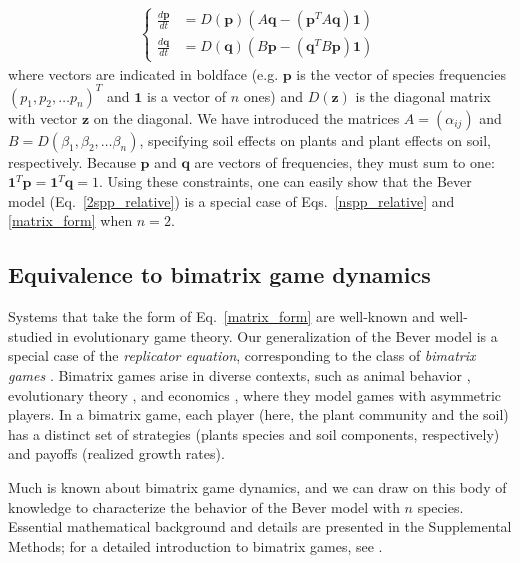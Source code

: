 \documentclass[11pt]{article}
\begin{document}
\begin{align} \label{matrix_form}
\begin{cases}
\frac{d\bm{p}}{dt} &= D(\bm{p}) \left(A \bm{q} - (\bm{p}^T A \bm{q}) \bm{1} \right) \\
\frac{d\bm{q}}{dt} &= D(\bm{q}) \left(B \bm{p} - (\bm{q}^T B \bm{p}) \bm{1}  \right) \,
\end{cases}
\end{align}
where vectors are indicated in boldface (e.g. $\bm{p}$ is the vector of species frequencies $(p_1, p_2, \dots p_n)^T$ and $\bm{1}$ is a vector of $n$ ones) and $D(\bm{z})$ is the diagonal matrix with vector $\bm{z}$ on the diagonal. We have introduced the matrices $A = (\alpha_{ij})$ and $B = D(\beta_1, \beta_2, \dots \beta_n)$, specifying soil effects on plants and plant effects on soil, respectively. Because $\bm{p}$ and $\bm{q}$ are vectors of frequencies, they must sum to one: $\bm{1}^T \bm{p} = \bm{1}^T \bm{q} = 1$. Using these constraints, one can easily show that the Bever model (Eq.~\ref{2spp_relative}) is a special case of Eqs.~\ref{nspp_relative} and \ref{matrix_form} when $n = 2$.

\subsection{Equivalence to bimatrix game dynamics}

Systems that take the form of Eq.~\ref{matrix_form} are well-known and well-studied in evolutionary game theory. Our generalization of the Bever model is a special case of the \emph{replicator equation}, corresponding to the class of \emph{bimatrix games} \citep{taylor1979evolutionarily,hofbauer1996evolutionary,hofbauer1998evolutionary,cressman2014replicator}. Bimatrix games arise in diverse contexts, such as animal behavior \citep{taylor1979evolutionarily,selten1988note}, evolutionary theory \citep{hofbauer1998evolutionary,cressman2014replicator}, and economics \citep{friedman1991evolutionary}, where they model games with asymmetric players. In a bimatrix game, each player (here, the plant community and the soil) has a distinct set of strategies (plants species and soil components, respectively) and payoffs (realized growth rates).

Much is known about bimatrix game dynamics, and we can draw on this body of knowledge to characterize the behavior of the Bever model with $n$ species. Essential mathematical background and details are presented in the Supplemental Methods; for a detailed introduction to bimatrix games, see \citet{hofbauer1998evolutionary}.
\end{document}
